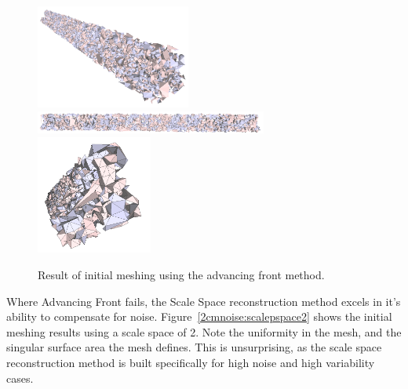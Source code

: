 \documentclass[12pt]{drexelthesis}
\begin{document}
\begin{figure}[!ht]
	\centering
		\includegraphics[width=2in]{simulated-lab-scan/2cmnoise/2cmmesh/advancingfront00.png}
		\includegraphics[width=3in]{simulated-lab-scan/2cmnoise/2cmmesh/advancingfront01.png}
		\includegraphics[width=1.5in]{simulated-lab-scan/2cmnoise/2cmmesh/advancingfront02.png}
		\caption[Initial meshing using a raw advancing front approach]{\centering  Result of initial meshing using the advancing front method.}
		\label{2cmnoise:advancingfront}
\end{figure}

Where Advancing Front fails, the Scale Space reconstruction method excels in it's ability to compensate for noise. Figure~\ref{2cmnoise:scalepspace2} shows the initial meshing results using a scale space of 2. Note the uniformity in the mesh, and the singular surface area the mesh defines. This is unsurprising, as the scale space reconstruction method is built specifically for high noise and high variability cases.
\end{document}
